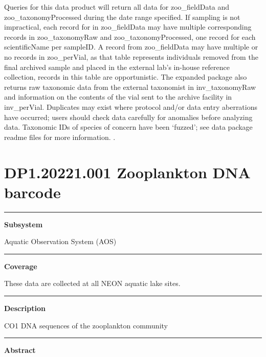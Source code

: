 \documentclass[]{article}
\begin{document}
Queries for this data product will return all data for zoo\_fieldData
and zoo\_taxonomyProcessed during the date range specified. If sampling
is not impractical, each record for in zoo\_fieldData may have multiple
corresponding records in zoo\_taxonomyRaw and zoo\_taxonomyProcessed,
one record for each scientificName per sampleID. A record from
zoo\_fieldData may have multiple or no records in zoo\_perVial, as that
table represents individuals removed from the final archived sample and
placed in the external lab's in-house reference collection, records in
this table are opportunistic. The expanded package also returns raw
taxonomic data from the external taxonomist in inv\_taxonomyRaw and
information on the contents of the vial sent to the archive facility in
inv\_perVial. Duplicates may exist where protocol and/or data entry
aberrations have occurred; users should check data carefully for
anomalies before analyzing data. Taxonomic IDs of species of concern
have been `fuzzed'; see data package readme files for more information.
\newpage
.

\section{DP1.20221.001 Zooplankton DNA
barcode}\label{dp1.20221.001-zooplankton-dna-barcode}

\begin{center}\rule{0.5\linewidth}{\linethickness}\end{center}

\textbf{Subsystem}

Aquatic Observation System (AOS)

\begin{center}\rule{0.5\linewidth}{\linethickness}\end{center}

\textbf{Coverage}

These data are collected at all NEON aquatic lake sites.

\begin{center}\rule{0.5\linewidth}{\linethickness}\end{center}

\textbf{Description}

CO1 DNA sequences of the zooplankton community

\begin{center}\rule{0.5\linewidth}{\linethickness}\end{center}

\textbf{Abstract}
\end{document}
